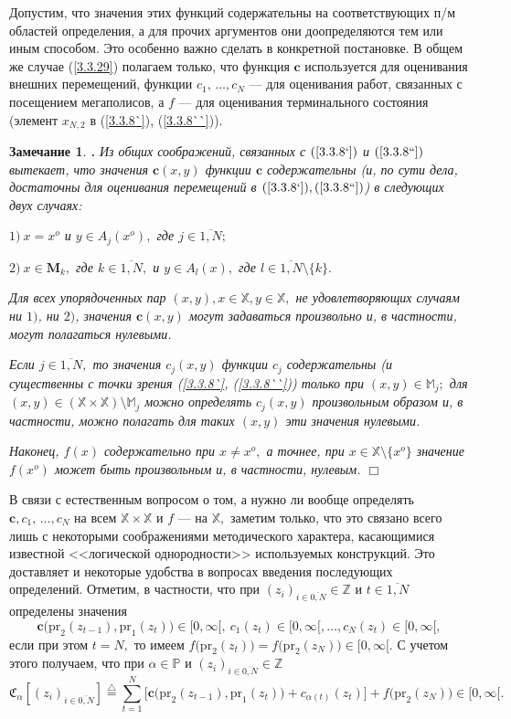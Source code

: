 \documentclass[11pt,twoside,openany]{report}
\newcommand{\bfn}{\begin{equation}}
\newcommand{\efn}{\end{equation}}
\newcommand{\df}{\stackrel{\triangle}{=}}
\newcommand{\ov}{\overline}
\newcounter{theo}
\newcounter{zam}
\newtheorem{zam}{Замечание}[section]
\newcommand{\TL}{\mbox{\bf{$\!\!$.}}}
\newcommand{\al}{\alpha}
\newcommand{\sm}{\setminus}
\newcommand{\bbz}{{\mathbb Z}}
\newcommand{\bbm}{{\mathbb M}}
\newcommand{\bbx}{{\mathbb X}}
\newcommand{\bbp}{{\mathbb P}}
\begin{document}
Допустим, что значения этих функций содержательны на соответствующих п/м
областей определения, а для прочих аргументов они доопределяются тем или иным
способом.
Это особенно важно сделать в конкретной постановке.
В общем же случае
(\ref{3.3.29})  полагаем только, что функция $\mathbf{c}$
используется для оценивания внешних перемещений,
функции $c_1,\,\ldots,c_N$ --- для оценивания работ,
связанных с посещением мегаполисов,
а $f$ --- для оценивания терминального состояния (элемент
$x_{N,2}$
в (\ref{3.3.8`}), (\ref{3.3.8``})).

\begin{zam}
  \label{z3.3.3}{\TL}
Из общих соображений, связанных с $(\ref{3.3.8`})$ и
$(\ref{3.3.8``})$ вытекает,
что значения $\mathbf{c}(x,y)$ функции $\mathbf{c}$
содержательны
(и, по сути дела, достаточны для оценивания перемещений в
$(\ref{3.3.8`}), (\ref{3.3.8``})$)
в следующих двух случаях:

$1)\ x = x^o$ и $y\in A_j(x^o),$ где $j\in \ov{1,N};$

$2)\ x\in \mathbf{M}_k,$ где $k\in \ov{1,N},$ и $y\in A_l(x),$ где
$l\in \ov{1,N}\sm\{k\}.$

Для всех упорядоченных пар $(x,y), x\in \bbx, y\in \bbx,$ не удовлетворяющих
случаям
ни $1)$, ни $2)$,
значения $\mathbf{c}(x,y)$ могут задаваться произвольно и,
в частности, могут полагаться нулевыми.

Если $j\in\ov{1,N},$
то значения $c_j(x,y)$  функции $c_j$ содержательны
(и существенны с точки зрения (\ref{3.3.8`}, (\ref{3.3.8``}))
только при $(x,y) \in \bbm_j;$
для $(x,y)\in (\bbx\times \bbx)\sm \bbm_j$ можно определять
$c_j(x,y)$ произвольным образом и, в частности, можно полагать
для таких $(x,y)$ эти значения нулевыми.

Наконец,
$f(x)$ содержательно при $x\neq x^o,$
а точнее, при
$x\in \bbx\sm \{x^o\}$
значение$f(x^o)$  может быть произвольным и, в частности, нулевым.
\hfill $\Box$
\end{zam}

В связи с естественным вопросом о том, а нужно ли вообще определять
$\mathbf{c},c_1,\,\ldots,c_N$
на всем $\bbx \times \bbx$ и $f$ --- на $\bbx,$
заметим только, что это связано всего лишь с некоторыми соображениями методического
характера,
касающимися известной <<логической однородности>> используемых конструкций.
Это доставляет и некоторые удобства в вопросах введения последующих определений.
Отметим, в частности, что при
$(z_i)_{i\in\ov{0,N}}\in \bbz$ и $t\in \ov{1,N}$
определены значения
$$
  \mathbf{c}\bigl(\mathrm{pr}_2(z_{t-1}),\mathrm{pr}_1(z_t)\bigl)\in
  [0,\infty[, \ c_1(z_t)\in [0,\infty[,\ldots,c_N(z_t)\in [0,\infty[
  ,
$$
если при этом $t = N,$
то имеем
$f\bigl(\mathrm{pr}_2(z_t)\bigl) = f\bigl(\mathrm{pr}_2(z_N)\bigl)\in [0,\infty[.$
С учетом этого получаем,
что при
$\al\in \bbp$ и $(z_i)_{i\in\ov{0,N}}\in \bbz$
\bfn
  \label{3.3.30}
  \mathfrak{C}_\al[(z_i)_{i\in\ov{0,N}}] \df
  \sum\limits_{t=1}^N\bigl[\mathbf{c}\bigl(\mathrm{pr}_2(z_{t-1}),
  \mathrm{pr}_1(z_t)\bigl) + c_{\al(t)}(z_t)\bigl] + f\bigl(\mathrm{pr}_2(z_N)
  \bigl) \in [0,\infty[.
\efn
\end{document}
